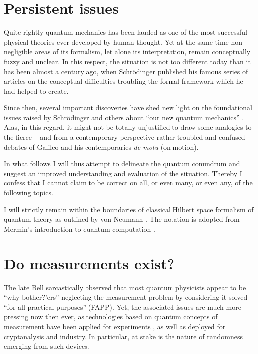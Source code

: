 \documentclass[%
  preprint,
 showpacs,
 showkeys,
 preprintnumbers,
 amsmath,amssymb,
 aps,
   pra,
  longbibliography,
 ]{revtex4-1}
\begin{document}
\maketitle

\tableofcontents


\section{Persistent issues}

Quite rightly quantum mechanics has been lauded as one of the most successful physical theories ever developed by human thought.
Yet at the same time non-negligible areas of its formalism, let alone its interpretation, remain conceptually fuzzy and unclear.
In this respect, the situation is not too different today than it has been almost a century ago,
when Schr\"odinger published his famous series of articles
\cite{schrodinger}
on the conceptual difficulties troubling the formal framework which he had helped to create.

Since then, several important discoveries have shed new light on the foundational issues raised by Schr\"odinger and others
about ``our new quantum mechanics'' \cite[p.~866]{born-26-1}.
Alas, in this regard, it might not be totally unjustified to draw some analogies to
the fierce -- and from a contemporary perspective rather troubled and confused --
debates of Galileo and his contemporaries \cite{Camerota-galilei} {\it de motu} (on motion).

In what follows I will thus attempt to delineate  the quantum conundrum
and suggest an improved understanding and evaluation of the situation.
Thereby I confess that I cannot claim to be correct on all, or even many, or even any, of the following topics.

I will strictly remain within the boundaries of classical Hilbert space formalism of quantum theory
as outlined by von Neumann \cite{v-neumann-49}.
The notation is adopted from Mermin's introduction to quantum computation \cite{mermin-04}.




\section{Do measurements exist?}


The late Bell sarcastically observed  \cite{bell-a} that most quantum physicists appear to be
``why bother?'ers'' \cite{dirac-noworries} neglecting the
measurement problem by considering it solved ``for all practical purposes'' (FAPP).
Yet, the associated issues are much more pressing now then ever,
as technologies \cite{zeilinger:qct,stefanov-2000} based on quantum concepts of measurement
have been applied for experiments \cite{wjswz-98},
as well as deployed for cryptanalysis and industry.
In particular, at stake is the nature of randomness emerging from such devices.
\end{document}

